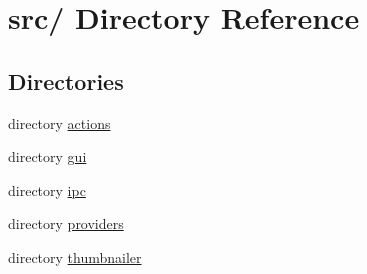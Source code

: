\hypertarget{dir_000000}{
\section{src/ Directory Reference}
\label{dir_000000}
}
\subsection*{Directories}
\begin{CompactItemize}
\item 
directory \hyperlink{dir_000010}{actions}
\item 
directory \hyperlink{dir_000001}{gui}
\item 
directory \hyperlink{dir_000031}{ipc}
\item 
directory \hyperlink{dir_000006}{providers}
\item 
directory \hyperlink{dir_000008}{thumbnailer}
\end{CompactItemize}
